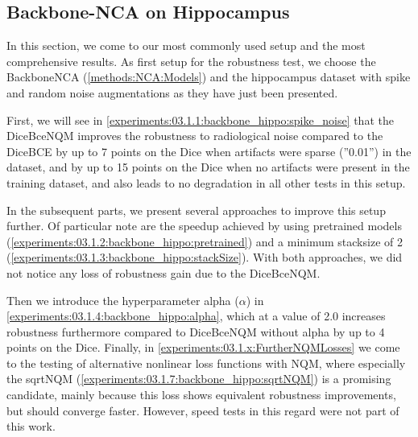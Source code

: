 \subsection{Backbone-NCA on Hippocampus}
\label{experiments:03.1.0:backbone_hippo:intro}
In this section, we come to our most commonly used setup and the most comprehensive results. 
As first setup for the robustness test, we choose the BackboneNCA (\autoref{methods:NCA:Models}) and the hippocampus dataset with spike and random noise augmentations as they have just been presented.

First, we will see in \autoref{experiments:03.1.1:backbone_hippo:spike_noise} that the DiceBceNQM improves the robustness to radiological noise compared to the DiceBCE 
by up to 7 points on the Dice when artifacts were sparse (''0.01'') in the dataset, and by up to 15 points on the Dice when no artifacts were present in the training dataset, and also leads to no degradation in all other tests in this setup.

In the subsequent parts, we present several approaches to improve this setup further. Of particular note are the speedup achieved by using pretrained models (\autoref{experiments:03.1.2:backbone_hippo:pretrained}) and a minimum stacksize of 2 (\autoref{experiments:03.1.3:backbone_hippo:stackSize}). With both approaches, we did not notice any loss of robustness gain due to the DiceBceNQM.

Then we introduce the hyperparameter alpha ($\alpha$) in \autoref{experiments:03.1.4:backbone_hippo:alpha}, which at a value of 2.0 increases robustness furthermore compared to DiceBceNQM without alpha by up to 4 points on the Dice.
Finally, in \autoref{experiments:03.1.x:FurtherNQMLosses} we come to the testing of alternative nonlinear loss functions with NQM, where especially the sqrtNQM (\autoref{experiments:03.1.7:backbone_hippo:sqrtNQM}) is a promising candidate, mainly because this loss shows equivalent robustness improvements, but should converge faster. However, speed tests in this regard were not part of this work.




